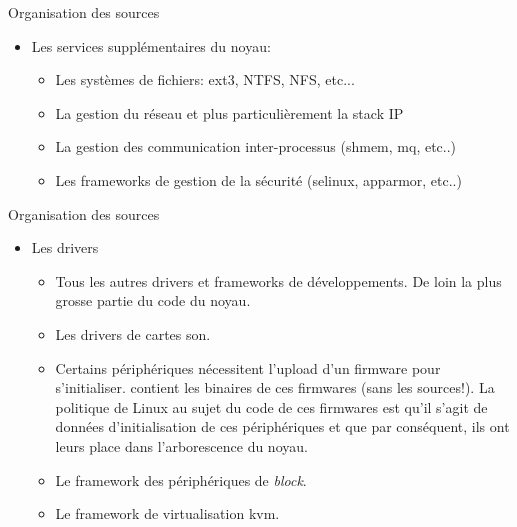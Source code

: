 \begin{frame}[fragile=singleslide]{Organisation des sources}
  \begin{itemize} 
  \item Les services supplémentaires du noyau:
    \begin{itemize}
    \item {} Les systèmes de fichiers: ext3, NTFS, NFS, etc...
    \item {} La gestion  du réseau et plus particulièrement la
      stack IP
    \item  {}  La  gestion  des  communication  inter-processus
      (shmem, mq, etc..)
    \item  {} Les  frameworks  de gestion  de la  sécurité
      (selinux, apparmor,  etc..)  
    \end{itemize} 
  \end{itemize}  
\end{frame}

\begin{frame}[fragile=singleslide]{Organisation des sources}
  \begin{itemize} 
  \item Les drivers
    \begin{itemize} 
    \item  {} Tous  les autres  drivers et  frameworks de
      développements. De loin la plus grosse partie du code du noyau.
    \item {} Les drivers de cartes son.
    \item {}  Certains périphériques nécessitent l'upload
      d'un firmware  pour s'initialiser.   contient les
      binaires de  ces firmwares (sans  les sources!). La  politique de
      Linux  au sujet du  code de  ces firmwares  est qu'il  s'agit de
      données  d'initialisation  de   ces  périphériques  et  que  par
      conséquent, ils ont leurs place dans l'arborescence du noyau.
    \item {} Le framework des périphériques de \emph{block}.
    \item {} Le framework de virtualisation kvm.
    \end{itemize} 
  \end{itemize}
\end{frame}

